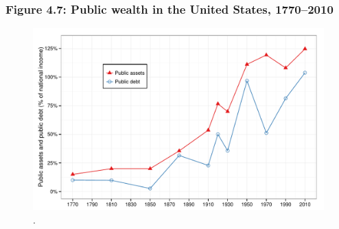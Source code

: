 \documentclass[t]{beamer}\usepackage[]{graphicx}\usepackage[]{color}
\newenvironment{knitrout}{}{} %
\begin{document}
\begin{frame}[label=Figure_4_7]
\frametitle{Figure 4.7: Public wealth in the United States, 1770--2010}
\begin{figure}[t]
\begin{minipage}[b]{\textwidth}
\centering
\begin{knitrout}\footnotesize
{}\color{fgcolor}

{\centering \includegraphics[width=1\linewidth]{figures/color/Figure_4_7} 

}



\end{knitrout}
\caption{.}
\end{minipage}
\end{figure}
\end{frame}
\end{document}
